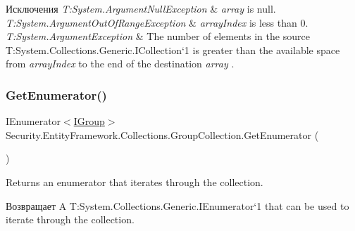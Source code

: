 \begin{DoxyExceptions}{Исключения}
{\em T\+:\+System.\+Argument\+Null\+Exception} & {\itshape array}  is null.\\
\hline
{\em T\+:\+System.\+Argument\+Out\+Of\+Range\+Exception} & {\itshape array\+Index}  is less than 0.\\
\hline
{\em T\+:\+System.\+Argument\+Exception} & The number of elements in the source T\+:\+System.\+Collections.\+Generic.\+I\+Collection`1 is greater than the available space from {\itshape array\+Index}  to the end of the destination {\itshape array} .\\
\hline
\end{DoxyExceptions}
\mbox{\label{class_security_1_1_entity_framework_1_1_collections_1_1_group_collection_a8b1982f1a6f433d23dc8f41e40b9636d}} 
\subsubsection{\texorpdfstring{Get\+Enumerator()}{GetEnumerator()}}
{\footnotesize\ttfamily I\+Enumerator$<$\hyperlink{interface_security_1_1_interfaces_1_1_model_1_1_i_group}{I\+Group}$>$ Security.\+Entity\+Framework.\+Collections.\+Group\+Collection.\+Get\+Enumerator (\begin{DoxyParamCaption}{ }\end{DoxyParamCaption})}



Returns an enumerator that iterates through the collection. 

\begin{DoxyReturn}{Возвращает}
A T\+:\+System.\+Collections.\+Generic.\+I\+Enumerator`1 that can be used to iterate through the collection. 
\end{DoxyReturn}
\mbox{\label{class_security_1_1_entity_framework_1_1_collections_1_1_group_collection_ad6df457b47f731ac3b5f5d557c1eb8b3}} 
